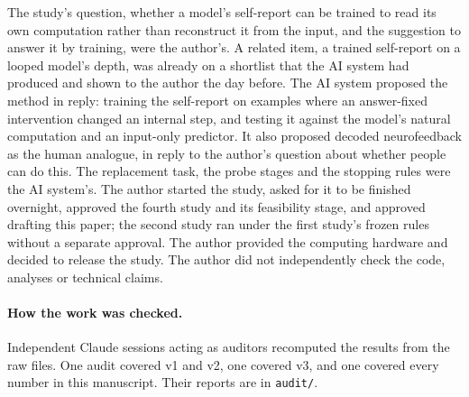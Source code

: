 \documentclass[11pt]{article}
\begin{document}
The study's question, whether a model's self-report can be trained to read its own computation rather than reconstruct it from the input, and the suggestion to answer it by training, were the author's. A related item, a trained self-report on a looped model's depth, was already on a shortlist that the AI system had produced and shown to the author the day before. The AI system proposed the method in reply: training the self-report on examples where an answer-fixed intervention changed an internal step, and testing it against the model's natural computation and an input-only predictor. It also proposed decoded neurofeedback as the human analogue, in reply to the author's question about whether people can do this. The replacement task, the probe stages and the stopping rules were the AI system's. The author started the study, asked for it to be finished overnight, approved the fourth study and its feasibility stage, and approved drafting this paper; the second study ran under the first study's frozen rules without a separate approval. The author provided the computing hardware and decided to release the study. The author did not independently check the code, analyses or technical claims.

\paragraph{How the work was checked.} Independent Claude sessions acting as auditors recomputed the results from the raw files. One audit covered v1 and v2, one covered v3, and one covered every number in this manuscript. Their reports are in \texttt{audit/}.



\end{document}
